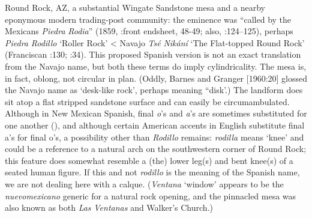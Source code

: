 Round Rock, AZ, a substantial Wingate Sandstone mesa and a nearby eponymous modern trading-post community:  the eminence was “called by the Mexicans \textit{Piedra} \textit{Rodia}” (1859, \citealt{Bailey1964a}:front endsheet, 48-49; also, \citealt{Linford2000}:124–125), perhaps \textit{Piedra} \textit{Rodillo} ‘Roller Rock’ < Navajo \textit{Tsé} \textit{Nikání} ‘The Flat-topped Round Rock’ (Franciscan \citealt{Fathers1910}:130; \citealt{Gregory1916}:34).  This proposed Spanish version is not an exact translation from the Navajo name, but both these terms do imply cylindricality.  The mesa is, in fact, oblong, not circular in plan.  (Oddly, Barnes and Granger [1960:20] glossed the Navajo name as ‘desk-like rock’, perhaps meaning “disk’.)  The landform does sit atop a flat stripped sandstone surface and can easily be circumambulated.  Although in New Mexican Spanish, final \textit{o}’s and \textit{a}’s are sometimes substituted for one another (\citealt{BillsVigil2008}), and although certain American accents in English substitute final a’s for final o’s, a possibility other than \textit{Rodillo} remains: \textit{rodilla} means ‘knee’ and could be a reference to a natural arch on the southwestern corner of Round Rock; this feature does somewhat resemble a (the) lower leg(s) and bent knee(s) of a seated human figure.  If this and not \textit{rodillo} is the meaning of the Spanish name, we are not dealing here with a calque.  (\textit{Ventana} ‘window’ appears to be the \textit{nuevomexicano} generic for a natural rock opening, and the pinnacled mesa was also known as both \textit{Las} \textit{Ventanas} and Walker’s Church.)

